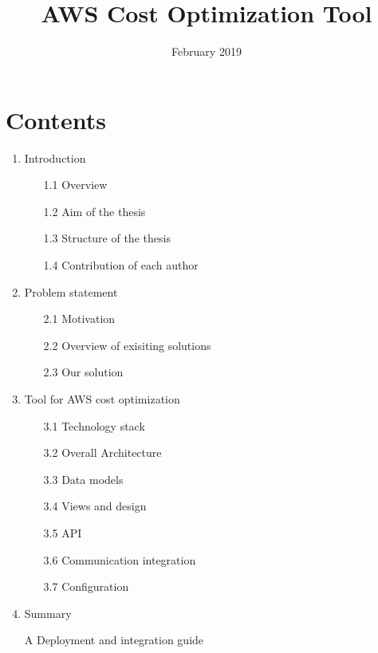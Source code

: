 \documentclass[licencjacka,en]{thesisclass}
\title{AWS Cost Optimization Tool}
\date{February 2019}
\begin{document}
    \maketitle

    \begin{abstract}
        
    \end{abstract}

    \chapter*{Contents}

    \begin{enumerate}
        \item Introduction
        \begin{enumerate}
            \item [1.1] Overview
            \item [1.2] Aim of the thesis
            \item [1.3] Structure of the thesis
            \item [1.4] Contribution of each author
        \end{enumerate}
        \item Problem statement
        \begin{enumerate}
            \item [2.1] Motivation
            \item [2.2] Overview of exisiting solutions
            \item [2.3] Our solution
        \end{enumerate}
        \item Tool for AWS cost optimization
        \begin{enumerate}
            \item [3.1] Technology stack
            \item [3.2] Overall Architecture
            \item [3.3] Data models
            \item [3.4] Views and design
            \item [3.5] API
            \item [3.6] Communication integration
            \item [3.7] Configuration
        \end{enumerate}
        \item Summary
        \item [A] Deployment and integration guide
    \end{enumerate}
\end{document}
